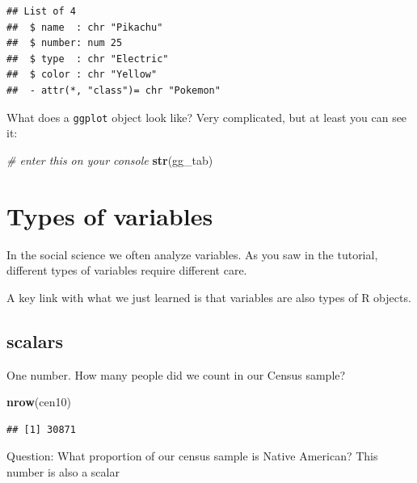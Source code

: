 \documentclass[
]{book}
\newenvironment{Shaded}{\begin{snugshade}}{\end{snugshade}}
\newcommand{\CommentTok}[1]{\textcolor[rgb]{0.56,0.35,0.01}{\textit{#1}}}
\newcommand{\KeywordTok}[1]{\textcolor[rgb]{0.13,0.29,0.53}{\textbf{#1}}}
\newcommand{\NormalTok}[1]{#1}
\newcommand{\OperatorTok}[1]{\textcolor[rgb]{0.81,0.36,0.00}{\textbf{#1}}}
\theoremstyle{definition}
\theoremstyle{definition}
\theoremstyle{definition}
\theoremstyle{definition}
\theoremstyle{remark}
\begin{document}
\begin{verbatim}
## List of 4
##  $ name  : chr "Pikachu"
##  $ number: num 25
##  $ type  : chr "Electric"
##  $ color : chr "Yellow"
##  - attr(*, "class")= chr "Pokemon"
\end{verbatim}

What does a \texttt{ggplot} object look like? Very complicated, but at least you can see it:

\begin{Shaded}
\begin{Highlighting}[]
\CommentTok{# enter this on your console}
\KeywordTok{str}\NormalTok{(gg_tab)}
\end{Highlighting}
\end{Shaded}

\hypertarget{types-of-variables}{%
\section{Types of variables}\label{types-of-variables}}

In the social science we often analyze variables. As you saw in the tutorial, different types of variables require different care.

A key link with what we just learned is that variables are also types of R objects.

\hypertarget{scalars}{%
\subsection{scalars}\label{scalars}}

One number. How many people did we count in our Census sample?

\begin{Shaded}
\begin{Highlighting}[]
\KeywordTok{nrow}\NormalTok{(cen10)}
\end{Highlighting}
\end{Shaded}

\begin{verbatim}
## [1] 30871
\end{verbatim}

Question: What proportion of our census sample is Native American? This number is also a scalar

\begin{Shaded}
\end{Shaded}
\end{document}
